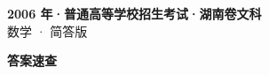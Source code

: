 \documentclass[zihao=-4, a4paper]{ctexart}
\begin{document}
\begin{center}
  {\Large\bfseries 2006 年·普通高等学校招生考试·湖南卷文科}\\[4pt]
  {\large 数学 · 简答版}
\end{center}
\medskip
{}

\clearpage
{}
\begin{center}{\Large\bfseries 答案速查}\end{center}
\medskip

\end{document}
